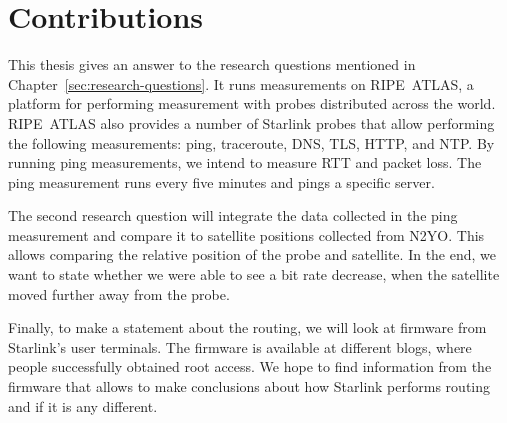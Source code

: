 \section{Contributions} \label{sec:contributions}

This thesis gives an answer to the research questions mentioned in Chapter~\ref{sec:research-questions}.
It runs measurements on RIPE~ATLAS, a platform for performing measurement with probes distributed across the world.
RIPE~ATLAS also provides a number of Starlink probes that allow performing the following measurements: ping, traceroute, DNS, TLS, HTTP, and NTP.
By running ping measurements, we intend to measure \ac{RTT} and packet loss. The ping measurement runs every five minutes and pings a specific server. 

The second research question will integrate the data collected in the ping measurement and compare it to satellite positions collected from N2YO. This allows comparing the relative position of the probe and satellite.
In the end, we want to state whether we were able to see a bit rate decrease, when the satellite moved further away from the probe.

Finally, to make a statement about the routing, we will look at firmware from Starlink's user terminals. The firmware is available at different blogs, where people successfully obtained root access.
We hope to find information from the firmware that allows to make conclusions about how Starlink performs routing and if it is any different.
